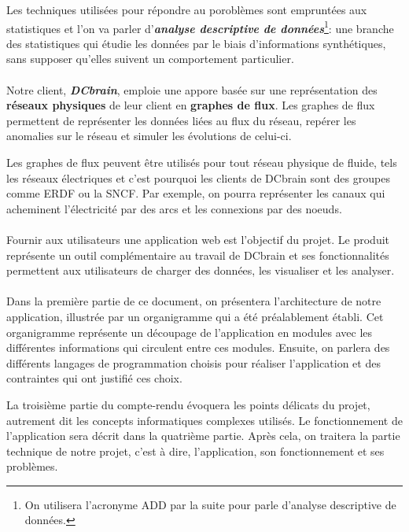 	Les techniques utilisées pour répondre au poroblèmes sont empruntées aux statistiques et l'on va parler d'\textit{\textbf{analyse descriptive de données}}\footnote{On utilisera l'acronyme ADD par la suite pour parle d'analyse descriptive de données.}: une branche des statistiques qui étudie les données par le biais d'informations synthétiques, sans supposer qu'elles suivent un comportement particulier.
	\paragraph{}Notre client, \textit{\textbf{DCbrain}}, emploie une appore basée sur une représentation des \textbf{réseaux physiques} de leur client en \textbf{graphes de flux}. Les graphes de flux permettent de représenter les données liées au flux du réseau, repérer les anomalies sur le réseau et simuler les évolutions de celui-ci.
	
	Les graphes de flux peuvent être utilisés pour tout réseau physique de fluide, tels les réseaux électriques et c’est pourquoi les clients de DCbrain sont des groupes comme ERDF ou la SNCF. Par exemple, on pourra représenter les canaux qui acheminent l'électricité par des arcs et les connexions par des noeuds.
	\paragraph{}Fournir aux utilisateurs une application web est l'objectif du projet. Le produit représente un outil complémentaire au travail de DCbrain et ses fonctionnalités permettent aux utilisateurs de charger des données, les visualiser et les analyser. 

	\paragraph{}Dans la première partie de ce document, on présentera l'architecture de notre application, illustrée par un organigramme qui a été préalablement établi. Cet organigramme représente un découpage de l'application en modules avec les différentes informations qui circulent entre ces modules.
	Ensuite, on parlera des différents langages de programmation choisis pour réaliser l'application et des contraintes qui ont justifié ces choix.
	
	La troisième partie du compte-rendu évoquera les points délicats du projet, autrement dit les concepts informatiques complexes utilisés.
	Le fonctionnement de l'application sera décrit dans la quatrième partie.
	Après cela, on traitera la partie technique de notre projet, c'est à dire, l'application, son fonctionnement et ses problèmes.
	

